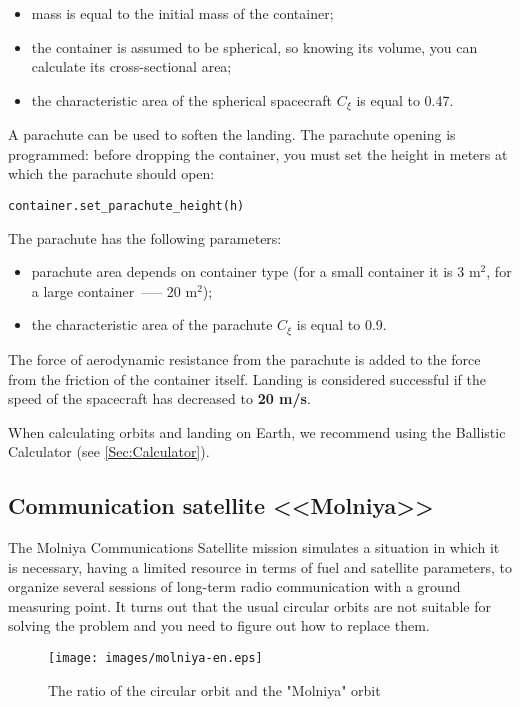 \documentclass[12pt,a4paper]{article}
\begin{document}
\begin{itemize}
   \item mass is equal to the initial mass of the container;
   \item the container is assumed to be spherical, so knowing its volume, you can calculate its cross-sectional area;
   \item the characteristic area of the spherical spacecraft $C_{\xi}$ is equal to 0.47.
\end{itemize}

A parachute can be used to soften the landing. The parachute opening is programmed: before dropping the container, you must set the height in meters at which the parachute should open:

\begin{verbatim}
container.set_parachute_height(h)
\end{verbatim}

The parachute has the following parameters:

\begin{itemize}
\item parachute area depends on container type (for a small container it is 3 $\text{m}^2$, for a large container~--— 20 $\text{m}^2$);
\item the characteristic area of the parachute $C_{\xi}$ is equal to 0.9.
\end{itemize}

The force of aerodynamic resistance from the parachute is added to the force from the friction of the container itself.
Landing is considered successful if the speed of the spacecraft has decreased to \textbf{20 m/s}.

When calculating orbits and landing on Earth, we recommend using the Ballistic Calculator (see \ref{Sec:Calculator}).

\clearpage
\subsection{Communication satellite <<Molniya>>}

The Molniya Communications Satellite mission simulates a situation in which it is necessary, having a limited resource in terms of fuel and satellite parameters, to organize several sessions of long-term radio communication with a ground measuring point. It turns out that the usual circular orbits are not suitable for solving the problem and you need to figure out how to replace them.

\begin{figure}[tbh]
  \begin{center}
    \texttt{[image: images/molniya-en.eps]}
    \caption{The ratio of the circular orbit and the "Molniya" orbit}
    \label{Pic:Molniya}
  \end{center}
\end{figure}
\end{document}
